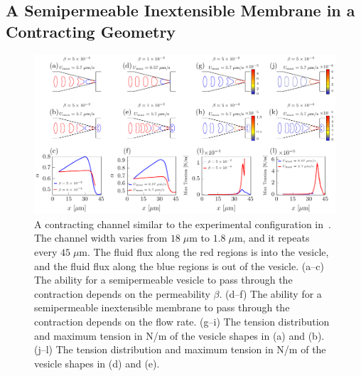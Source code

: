 \documentclass[prb,preprint,showpacs,preprintnumbers,amsmath,amssymb,longbibliography]{revtex4-1}
\newif\ifTikz
\begin{document}

\subsection{A Semipermeable Inextensible Membrane in a Contracting Geometry} 
\begin{figure}[htp]
  \centering
    \centering
  \ifTikz
  
  \else
  \includegraphics{figures/contractingComposite.pdf}
  \fi
  \caption{\label{fig:contractingComposite} A contracting channel
  similar to the experimental configuration in~\citet{wu2015critical}.
  The channel width varies from $18\;\mu$m to $1.8\;\mu$m, and it
  repeats every $45\;\mu$m. The fluid flux along the red regions is into
  the vesicle, and the fluid flux along the blue regions is out of the
  vesicle.  (a--c) The ability for a semipermeable vesicle to pass
  through the contraction depends on the permeability $\beta$. (d--f)
  The ability for a semipermeable inextensible membrane to pass through the
  contraction depends on the flow rate. (g--i) The tension distribution
  and maximum tension in N/m of the vesicle shapes in (a) and (b).
  (j--l) The tension distribution and maximum tension in N/m of the
  vesicle shapes in (d) and (e).}
\end{figure}
\end{document}
